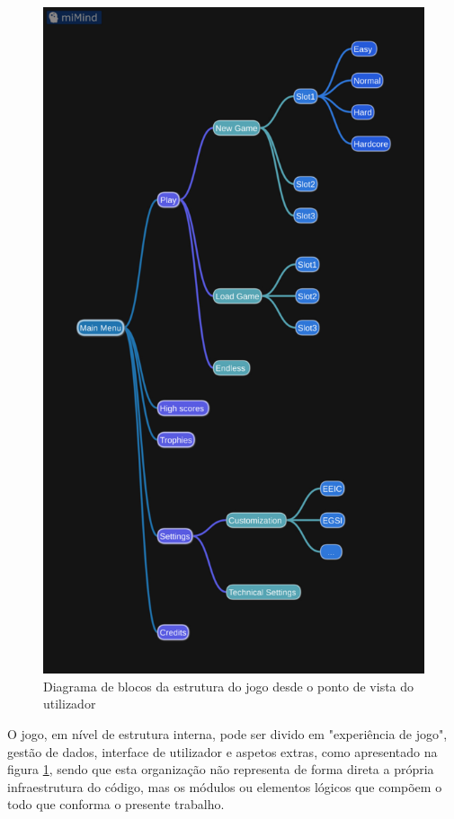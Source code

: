\documentclass[a4paper,11pt]{article}
\begin{document}
\begin{figure}[]
    \centering
    \includegraphics[scale = 0.20]{2 - Esquemas/GameStructure.pdf}
    \caption{Diagrama de blocos da estrutura do jogo desde o ponto de vista do utilizador}
    \label{fig:GameModulesDiagram}
\end{figure}

O jogo, em nível de estrutura interna, pode ser divido em "experiência de jogo", gestão de dados, interface de utilizador e aspetos extras, como apresentado na figura \ref{fig:GameModulesDiagram}, sendo que esta organização não representa de forma direta a própria infraestrutura do código, mas os módulos ou elementos lógicos que compõem o todo que conforma o presente trabalho.
\end{document}
